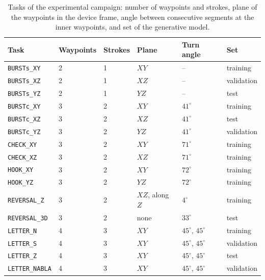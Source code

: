 \documentclass[12pt]{report}
\begin{document}
\begin{table}[htbp]
    \centering
    \caption{Tasks of the experimental campaign: number of waypoints and strokes, plane of the waypoints in the device frame, angle between consecutive segments at the inner waypoints, and set of the generative model.}
    \label{tab:tasks}
    \begin{tabular}{llllll}
        \toprule
        Task & Waypoints & Strokes & Plane & Turn angle & Set\\
        \midrule
        \texttt{BURSTs\_XY}    & 2 & 1 & $XY$ & --                     & training\\
        \texttt{BURSTs\_XZ}    & 2 & 1 & $XZ$ & --                     & validation\\
        \texttt{BURSTs\_YZ}    & 2 & 1 & $YZ$ & --                     & test\\
        \midrule
        \texttt{BURSTc\_XY}    & 3 & 2 & $XY$ & $41^\circ$             & training\\
        \texttt{BURSTc\_XZ}    & 3 & 2 & $XZ$ & $41^\circ$             & test\\
        \texttt{BURSTc\_YZ}    & 3 & 2 & $YZ$ & $41^\circ$             & validation\\
        \texttt{CHECK\_XY}     & 3 & 2 & $XY$ & $71^\circ$             & training\\
        \texttt{CHECK\_XZ}     & 3 & 2 & $XZ$ & $71^\circ$             & training\\
        \texttt{HOOK\_XY}      & 3 & 2 & $XY$ & $72^\circ$             & training\\
        \texttt{HOOK\_YZ}      & 3 & 2 & $YZ$ & $72^\circ$             & training\\
        \texttt{REVERSAL\_Z}   & 3 & 2 & $XZ$, along $Z$ & $4^\circ$   & training\\
        \texttt{REVERSAL\_3D}  & 3 & 2 & none & $33^\circ$             & test\\
        \midrule
        \texttt{LETTER\_N}     & 4 & 3 & $XY$ & $45^\circ$, $45^\circ$ & training\\
        \texttt{LETTER\_S}     & 4 & 3 & $XY$ & $45^\circ$, $45^\circ$ & validation\\
        \texttt{LETTER\_Z}     & 4 & 3 & $XY$ & $45^\circ$, $45^\circ$ & test\\
        \texttt{LETTER\_NABLA} & 4 & 3 & $XY$ & $45^\circ$, $45^\circ$ & validation\\
        \bottomrule
    \end{tabular}
\end{table}
\end{document}

